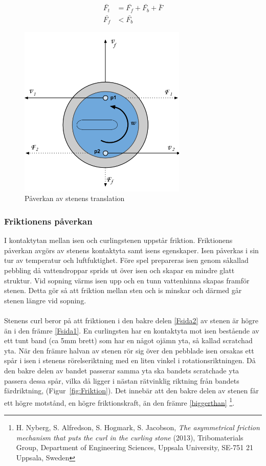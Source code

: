 \documentclass[11pt]{article} %
\begin{document}
\begin{subequations}\label{Ftot}
 \begin{align}
 \bar{F_t}&=\bar{F_f}+\bar{F_b}+\bar{F}\\
 \bar{F_f}&<\bar{F_b}
 \end{align}
 \end{subequations}

\begin{figure}[ht!]
\centering
\includegraphics[width=80mm]{Translation.png}
\caption{Påverkan av stenens translation}
\label{fig:Translation}
\label{overflow}
\end{figure}

\subsubsection{Friktionens påverkan}
I kontaktytan mellan isen och curlingstenen uppstår friktion. 
Friktionens påverkan avgörs av stenens kontaktyta samt isens egenskaper. 
Isen påverkas i sin tur av temperatur och luftfuktighet. 
Före spel prepareras isen genom såkallad pebbling då vattendroppar sprids ut över isen och skapar en mindre glatt struktur.
Vid sopning värms isen upp och en tunn vattenhinna skapas framför stenen. Detta gör så att friktion mellan sten och is minskar och därmed går stenen längre vid sopning.  
\\\\Stenens curl beror på att friktionen i den bakre delen \eqref{Fsida2} av stenen är högre än i den främre \eqref{Fsida1}.  
En curlingsten har en kontaktyta mot isen bestående av ett tunt band (ca 5mm brett) som har en något ojämn yta, så kallad scratchad yta. 
När den främre halvan av stenen rör sig över den pebblade isen orsakas ett spår i isen i stenens rörelseriktning med en liten vinkel i rotationsriktningen. 
Då den bakre delen av bandet passerar samma yta ska bandets scratchade yta passera dessa spår, vilka då ligger i nästan rätvinklig riktning från bandets färdriktning, (Figur~\ref{fig:Friktion}). 
Det innebär att den bakre delen av stenen får ett högre motstånd, en högre friktionskraft, än den främre \eqref{biggerthan}
\footnote{H. Nyberg, S. Alfredson, S. Hogmark, S. Jacobson, \emph{The asymmetrical friction mechanism that puts the curl in the curling stone} (2013), Tribomaterials Group, Department of Engineering Sciences, Uppsala University, SE-751 21 Uppsala, Sweden}.
\end{document}
